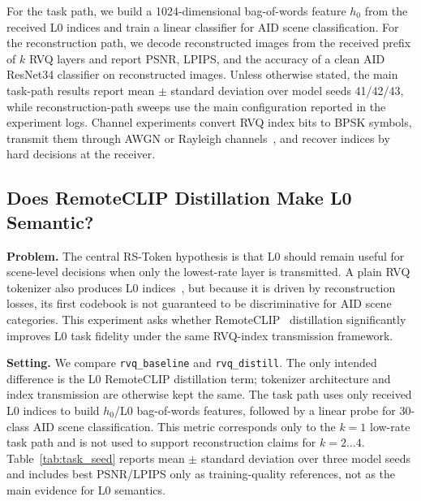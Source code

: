 \documentclass[lettersize,journal]{IEEEtran}
\begin{document}
For the task path, we build a 1024-dimensional bag-of-words feature $h_0$ from the received L0 indices and train a linear classifier for AID scene classification. For the reconstruction path, we decode reconstructed images from the received prefix of $k$ RVQ layers and report PSNR, LPIPS, and the accuracy of a clean AID ResNet34 classifier on reconstructed images. Unless otherwise stated, the main task-path results report mean $\pm$ standard deviation over model seeds 41/42/43, while reconstruction-path sweeps use the main configuration reported in the experiment logs. Channel experiments convert RVQ index bits to BPSK symbols, transmit them through AWGN or Rayleigh channels~\cite{proakis}, and recover indices by hard decisions at the receiver.

\subsection{Does RemoteCLIP Distillation Make L0 Semantic?}
\textbf{Problem.} The central RS-Token hypothesis is that L0 should remain useful for scene-level decisions when only the lowest-rate layer is transmitted. A plain RVQ tokenizer also produces L0 indices~\cite{lee2022residual}, but because it is driven by reconstruction losses, its first codebook is not guaranteed to be discriminative for AID scene categories. This experiment asks whether RemoteCLIP~\cite{liu2024remoteclip} distillation significantly improves L0 task fidelity under the same RVQ-index transmission framework.

\textbf{Setting.} We compare \texttt{rvq\_baseline} and \texttt{rvq\_distill}. The only intended difference is the L0 RemoteCLIP distillation term; tokenizer architecture and index transmission are otherwise kept the same. The task path uses only received L0 indices to build $h_0$/L0 bag-of-words features, followed by a linear probe for 30-class AID scene classification. This metric corresponds only to the $k=1$ low-rate task path and is not used to support reconstruction claims for $k=2\ldots4$. Table~\ref{tab:task_seed} reports mean $\pm$ standard deviation over three model seeds and includes best PSNR/LPIPS only as training-quality references, not as the main evidence for L0 semantics.
\end{document}
